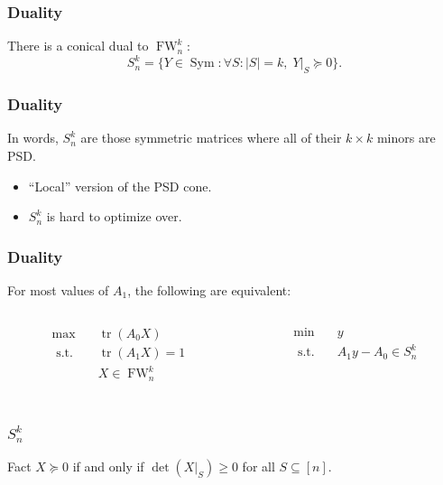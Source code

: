 \documentclass{beamer}
\DeclareMathOperator{\Sym}{Sym}
\DeclareMathOperator{\FW}{FW}
\DeclareMathOperator{\tr}{tr}
\newcommand{\st}{{\text{ s.t. }}}
\begin{document}
\begin{frame}
    \frametitle{Duality}
    There is a conical dual to $\FW^k_n$:
    \[
        S^k_n = \{Y \in \Sym : \forall S : |S| = k, \;Y|_S \succeq 0\}.
    \]
\end{frame}
\begin{frame}
    \frametitle{Duality}
    In words, $S^k_n$ are those symmetric matrices where all of their $k\times k$ minors are PSD.
    \begin{itemize}
        \item ``Local'' version of the PSD cone.
        \item $S^k_n$ is hard to optimize over.
    \end{itemize}
\end{frame}
\begin{frame}
    \frametitle{Duality}
    For most values of $A_1$, the following are equivalent:
    \begin{columns}
        \begin{column}{0.5\textwidth}
            \begin{equation*}
                \begin{aligned}
                    \max\quad & \tr(A_0X)\\
                    \st & \tr(A_1X) = 1\\
                        & X \in \FW^k_n\\
                \end{aligned}
            \end{equation*}
        \end{column}
        \begin{column}{0.5\textwidth}
            \begin{equation*}
                \begin{aligned}
                    \min\quad & y\\
                    \st & A_1y - A_0 \in S^k_n\\
                \end{aligned}
            \end{equation*}
        \end{column}
    \end{columns}
\end{frame}
\begin{frame}
    \frametitle{$S^k_n$}
    \begin{block}{Fact}
        $X \succeq 0$ if and only if $\det(X|_S) \ge 0$ for all $S \subseteq [n]$.
    \end{block}
\end{frame}
\end{document}
